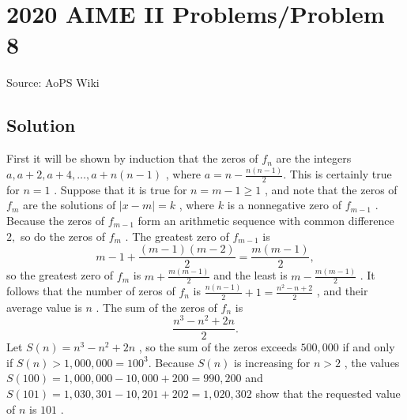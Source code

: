 \documentclass[12pt]{article}
\begin{document}
\section*{{2020 AIME II Problems/Problem 8}}
Source: AoPS Wiki

\subsection*{Solution}
First it will be shown by induction that the zeros of $f_n$ are the integers $a, {a+2,} {a+4,} \dots, {a + n(n-1)}$ , where $a = n - \frac{n(n-1)}2.$ This is certainly true for $n=1$ . Suppose that it is true for $n = m-1 \ge 1$ , and note that the zeros of $f_m$ are the solutions of $|x - m| = k$ , where $k$ is a nonnegative zero of $f_{m-1}$ . Because the zeros of $f_{m-1}$ form an arithmetic sequence with common difference $2,$ so do the zeros of $f_m$ . The greatest zero of $f_{m-1}$ is \[m-1+\frac{(m-1)(m-2)}2 =\frac{m(m-1)}2,\] so the greatest zero of $f_m$ is $m+\frac{m(m-1)}2$ and the least is $m-\frac{m(m-1)}2$ . It follows that the number of zeros of $f_n$ is $\frac{n(n-1)}2+1=\frac{n^2-n+2}2$ , and their average value is $n$ . The sum of the zeros of $f_n$ is \[\frac{n^3-n^2+2n}2.\] Let $S(n)=n^3-n^2+2n$ , so the sum of the zeros exceeds $500{,}000$ if and only if $S(n) > 1{,}000{,}000 = 100^3\!.$ Because $S(n)$ is increasing for $n > 2$ , the values $S(100) = 1{,}000{,}000 - 10{,}000 + 200 = 990{,}200$ and $S(101)=1{,}030{,}301 - 10{,}201 + 202 = 1{,}020{,}302$ show that the requested value of $n$ is $\boxed{101}$ .
\end{document}
